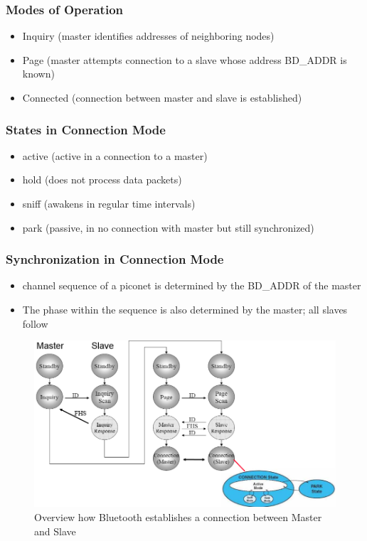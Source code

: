 \subsubsection{Modes of Operation}
\begin{itemize}[noitemsep]
\item Inquiry (master identifies addresses of neighboring nodes)
\item Page (master attempts connection to a slave whose address BD\_ADDR is known)
\item Connected (connection between master and slave is established) 
\end{itemize}

\subsubsection{States in Connection Mode}
\begin{itemize}[noitemsep]
\item active (active in a connection to a master)
\item hold (does not process data packets)
\item sniff (awakens in regular time intervals)
\item park (passive, in no connection with master but still synchronized)
\end{itemize}

\subsubsection{Synchronization in Connection Mode}
\begin{itemize}[noitemsep]
\item channel sequence of a piconet is determined by the BD\_ADDR of the master
\item The phase within the sequence is also determined by the master; all slaves follow
\end{itemize}

\begin{figure}[ht]
	\centering
  	\includegraphics[scale=0.4]{img/8_establish_connection.png}
	\caption{Overview how Bluetooth establishes a connection between Master and Slave}
	\label{fig_establish_connection}
\end{figure}


